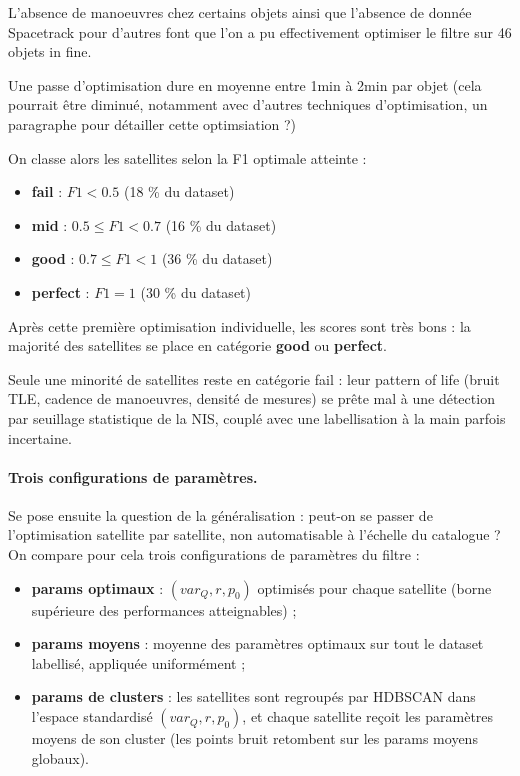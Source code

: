 \documentclass{article}
\begin{document}
L'absence de manoeuvres chez certains objets ainsi que l'absence de donnée Spacetrack pour d'autres font que l'on a pu effectivement optimiser le filtre sur 46 objets in fine.

Une passe d'optimisation dure en moyenne entre 1min à 2min par objet (cela pourrait être diminué, notamment avec d'autres techniques d'optimisation, un paragraphe pour détailler cette optimsiation ?)

On classe alors les satellites selon la F1 optimale atteinte :
\begin{itemize}
    \item \textbf{fail} : $F1 < 0.5$  (18 \% du dataset)
    \item \textbf{mid} : $0.5 \leq F1 < 0.7$ (16 \% du dataset)
    \item \textbf{good} : $0.7 \leq F1 < 1$ (36 \% du dataset)
    \item \textbf{perfect} : $F1 = 1$ (30 \% du dataset)
\end{itemize}


Après cette première optimisation individuelle, les scores sont très bons : la majorité des satellites se place en catégorie \textbf{good} ou \textbf{perfect}.

Seule une minorité de satellites reste en catégorie fail : leur pattern of life (bruit TLE, cadence de manoeuvres, densité de mesures) se prête mal à une détection par seuillage statistique de la NIS, couplé avec une labellisation à la main parfois incertaine.

\paragraph{Trois configurations de paramètres.}
Se pose ensuite la question de la généralisation : peut-on se passer de l'optimisation satellite par satellite, non automatisable à l'échelle du catalogue ? On compare pour cela trois configurations de paramètres du filtre :
\begin{itemize}
    \item \textbf{params optimaux} : $(var_Q, r, p_0)$ optimisés pour chaque satellite (borne supérieure des performances atteignables) ;
    \item \textbf{params moyens} : moyenne des paramètres optimaux sur tout le dataset labellisé, appliquée uniformément ;
    \item \textbf{params de clusters} : les satellites sont regroupés par HDBSCAN dans l'espace standardisé $(var_Q, r, p_0)$, et chaque satellite reçoit les paramètres moyens de son cluster (les points bruit retombent sur les params moyens globaux).
\end{itemize}
\end{document}
